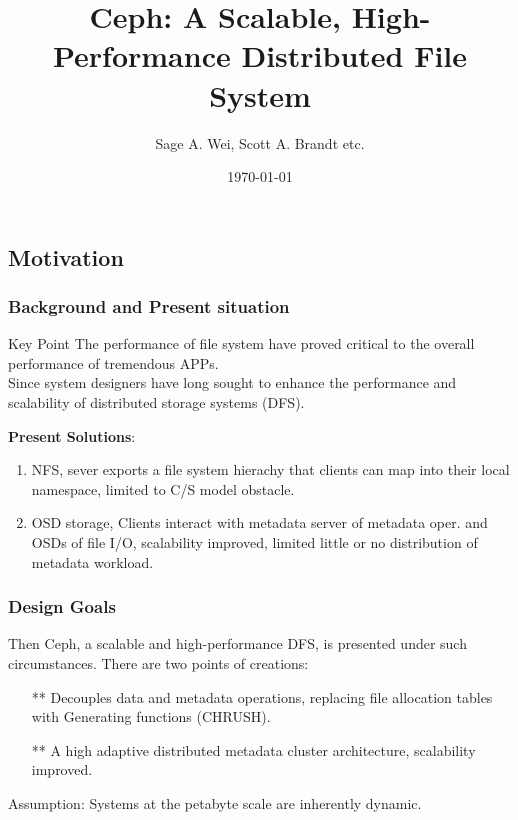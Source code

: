 \documentclass[cjk,slidestop,mathserif]{beamer}
\begin{document}
\begin{CJK}{UTF8}{gkai}
\title{Ceph: A Scalable, High-Performance Distributed File System}
\author{Sage A. Wei, Scott A. Brandt etc.}
\date{\today}
\frame{\titlepage}%
 

\frame{\tableofcontents}%
\section{Motivation}
\begin{frame}
 \frametitle{Background and Present situation}
 \begin{exampleblock}{Key Point}
 The performance of file system have proved critical to the overall performance of tremendous APPs.  \\
 
 Since system designers have long sought to enhance the performance and scalability of distributed storage systems (DFS).
  \end{exampleblock}
  
  \textbf{Present Solutions}:
  \begin{enumerate}
   \item NFS, sever exports a file system hierachy that clients can map into their local namespace, \alert{limited} to C/S model obstacle.
   \item OSD storage, Clients interact with metadata server of metadata oper. and OSDs of file I/O, scalability improved, \alert{limited} little or no distribution of metadata workload. 
  \end{enumerate}
\end{frame}

\begin{frame}
 \frametitle{Design Goals}
 \vspace{8pt}
 Then Ceph, a scalable and high-performance DFS, is presented under such circumstances. There are two points of creations:
 \begin{itemize}
  \item[**] Decouples data and metadata operations, replacing file allocation tables with Generating functions (CHRUSH).
  \item[**] A high adaptive distributed metadata cluster architecture, scalability improved.
 \end{itemize}
 \vspace{4pt}
\alert{Assumption}: Systems at the petabyte scale are inherently dynamic.
\end{frame}


\end{CJK}
\end{document}
